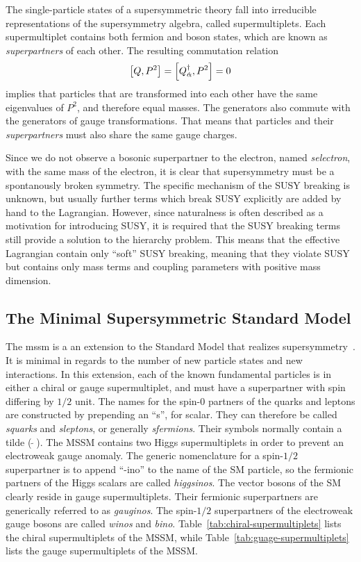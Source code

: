 The single-particle states of a supersymmetric theory fall into irreducible representations of the supersymmetry algebra, called supermultiplets. Each supermultiplet contains both fermion and boson states, which are known as \emph{superpartners} of each other. The resulting commutation relation
\begin{equation}
\comm{Q}{P^2}=\comm{Q^{\dagger}_{\dot{\alpha}}}{P^2}=0
\end{equation}
implies that particles that are transformed into each other have the same eigenvalues of $P^2$, and therefore equal masses. The generators also commute with the generators of gauge transformations. That means that particles and their \emph{superpartners} must also share the same gauge charges.

Since we do not observe a bosonic superpartner to the electron, named \emph{selectron}, with the same mass of the electron, it is clear that supersymmetry must be a spontanously broken symmetry. The specific mechanism of the SUSY breaking is unknown, but usually further terms which break SUSY explicitly are added by hand to the Lagrangian. However, since naturalness is often described as a motivation for introducing SUSY, it is required that the SUSY breaking terms still provide a solution to the hierarchy problem. This means that the effective Lagrangian contain only “soft” SUSY breaking, meaning that they violate SUSY but contains only mass terms and coupling parameters with positive mass dimension.

\subsection{The Minimal Supersymmetric Standard Model}

The \gls{mssm} is a an extension to the Standard Model that realizes supersymmetry~\cite{MARTIN_1998}. It is minimal in regards to the number of new particle states and new interactions. In this extension, each of the known fundamental particles is in either a chiral or gauge supermultiplet, and must have a superpartner with spin differing by $1/2$ unit. The names for the spin-0 partners of the quarks and leptons are constructed by prepending an “s”, for scalar. They can therefore be called \emph{squarks} and \emph{sleptons}, or generally \emph{sfermions}. Their symbols normally contain a tilde ($\widetilde{\,\,\,}$). The MSSM contains two Higgs supermultiplets in order to prevent an electroweak gauge anomaly. The generic nomenclature for a spin-$1/2$ superpartner is to append “-ino” to the name of the SM particle, so the fermionic partners of the Higgs scalars are called \emph{higgsinos}. The vector bosons of the SM clearly reside in gauge supermultiplets. Their fermionic superpartners are generically referred to as \emph{gauginos}. The spin-$1/2$ superpartners of the electroweak gauge bosons are called \emph{winos} and \emph{bino}. Table~\ref{tab:chiral-supermultiplets} lists the chiral supermultiplets of the MSSM, while Table~\ref{tab:guage-supermultiplets} lists the gauge supermultiplets of the MSSM.

